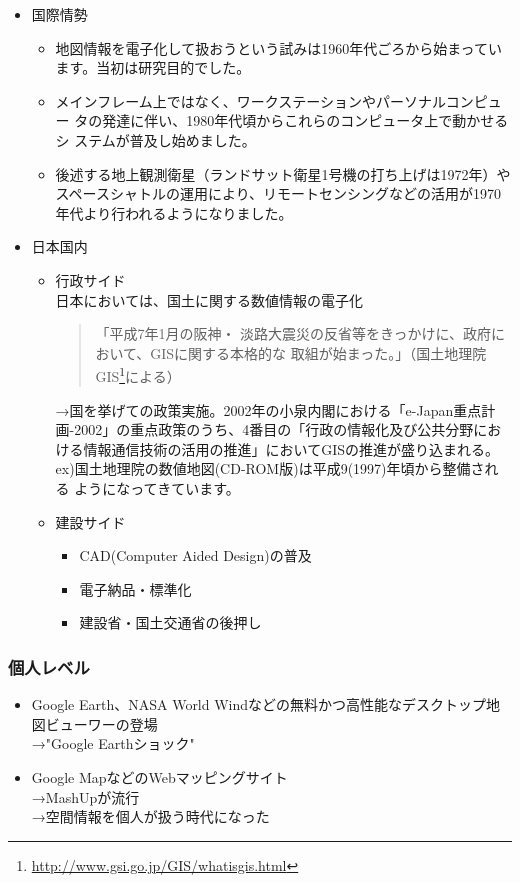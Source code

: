 \documentclass[mingoth,a4paper]{jsarticle}
\begin{document}
\begin{itemize}
 \item 国際情勢
       \begin{itemize}
	\item 地図情報を電子化して扱おうという試みは1960年代ごろから始まってい
	      ます。当初は研究目的でした。
	\item メインフレーム上ではなく、ワークステーションやパーソナルコンピュー
	      タの発達に伴い、1980年代頃からこれらのコンピュータ上で動かせるシ
	      ステムが普及し始めました。
	\item 後述する地上観測衛星（ランドサット衛星1号機の打ち上げは1972年）や
	      スペースシャトルの運用により、リモートセンシングなどの活用が1970
	      年代より行われるようになりました。
       \end{itemize}
 \item 日本国内
 \begin{itemize}
  \item 行政サイド \\
	日本においては、国土に関する数値情報の電子化
	\begin{quotation}
	 「平成7年1月の阪神・
	 淡路大震災の反省等をきっかけに、政府において、GISに関する本格的な
	 取組が始まった。」（国土地理院
	 GIS\footnote{\url{http://www.gsi.go.jp/GIS/whatisgis.html}}による） 
	\end{quotation}
	→国を挙げての政策実施。2002年の小泉内閣における「e-Japan重点計
	画-2002」の重点政策のうち、4番目の「行政の情報化及び公共分野にお
	ける情報通信技術の活用の推進」においてGISの推進が盛り込まれる。
	ex)国土地理院の数値地図(CD-ROM版)は平成9(1997)年頃から整備される
	ようになってきています。
  \item 建設サイド
	\begin{itemize}
	 \item CAD(Computer Aided Design)の普及
	 \item 電子納品・標準化
	 \item 建設省・国土交通省の後押し
	\end{itemize}
 \end{itemize}
\end{itemize}

\subsubsection{個人レベル}
\begin{itemize}
 \item Google Earth、NASA World Windなどの無料かつ高性能なデスクトップ地
       図ビューワーの登場 \\
       →"Google Earthショック"
 \item Google MapなどのWebマッピングサイト \\
       →MashUpが流行\\
       →空間情報を個人が扱う時代になった
\end{itemize}
\end{document}
